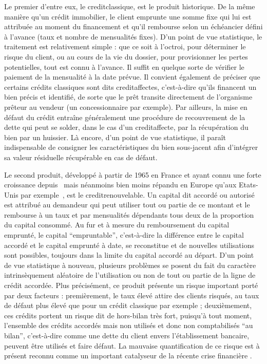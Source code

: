 Le premier d'entre eux, le \gls{creditclassique}, est le produit historique. De la même manière qu'un crédit immobilier, le client emprunte une somme fixe qui lui est attribuée au moment du financement et qu'il rembourse selon un échéancier défini à l'avance (taux et nombre de mensualités fixes). D'un point de vue statistique, le traitement est relativement simple : que ce soit à l'octroi, pour déterminer le risque du client, ou au cours de la vie du dossier, pour provisionner les pertes potentielles, tout est connu à l'avance. Il suffit en quelque sorte de vérifier le paiement de la mensualité à la date prévue. Il convient également de préciser que certains crédits classiques sont dits \glspl{creditaffecte}, c'est-à-dire qu'ils financent un bien précis et identifié, de sorte que le prêt transite directement de l'organisme prêteur au vendeur (un concessionnaire par exemple). Par ailleurs, la mise en défaut du crédit entraîne généralement une procédure de recouvrement de la dette qui peut se solder, dans le cas d'un \gls{creditaffecte}, par la récupération du bien par un huissier. Là encore, d'un point de vue statistique, il paraît indispensable de consigner les caractéristiques du bien sous-jacent afin d'intégrer sa valeur résiduelle récupérable en cas de défaut.


Le second produit, développé à partir de 1965 en France et ayant connu une forte croissance depuis~\cite{ducourant2009credit} mais néanmoins bien moins répandu en Europe qu'aux Etats-Unis par exemple~\cite{credit_cards_country}, est le \gls{creditrenouvelable}. Un capital dit accordé ou autorisé est attribué au demandeur qui peut utiliser tout ou partie de ce montant et le rembourse à un taux et par mensualités dépendants tous deux de la proportion du capital consommé. Au fur et à mesure du remboursement du capital emprunté, le capital ``empruntable'', c'est-à-dire la différence entre le capital accordé et le capital emprunté à date, se reconstitue et de nouvelles utilisations sont possibles, toujours dans la limite du capital accordé au départ. D'un point de vue statistique à nouveau, plusieurs problèmes se posent du fait du caractère intrinsèquement aléatoire de l'utilisation ou non de tout ou partie de la ligne de crédit accordée. Plus précisément, ce produit présente un risque important porté par deux facteurs : premièrement, le taux élevé attire des clients risqués, au taux de défaut plus élevé que pour un crédit classique par exemple ; deuxièmement, ces crédits portent un risque dit de hors-bilan très fort, puisqu'à tout moment, l'ensemble des crédits accordés mais non utilisés et donc non comptabilisés ``au bilan'', c'est-à-dire comme une dette du client envers l'établissement bancaire, peuvent être utilisés et faire défaut. La mauvaise quantification de ce risque est à présent reconnu comme un important catalyseur de la récente crise financière \cite{karim2013off}.


